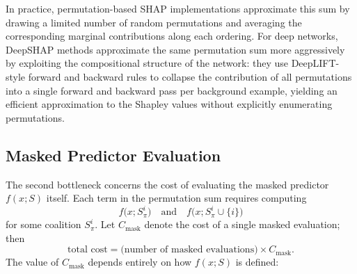 \documentclass{article}
\begin{document}
In practice, permutation-based SHAP implementations approximate this sum by drawing a limited number of random permutations and averaging the corresponding marginal contributions along each ordering.
For deep networks, DeepSHAP methods approximate the same permutation sum more aggressively by exploiting the compositional structure of the network: they use DeepLIFT-style forward and backward rules to collapse the contribution of all permutations into a single forward and backward pass per background example, yielding an efficient approximation to the Shapley values without explicitly enumerating permutations.

\subsection{Masked Predictor Evaluation}

The second bottleneck concerns the cost of evaluating the masked predictor $f(x; S)$ itself.
Each term in the permutation sum requires computing
\[
f\bigl(x; S_\pi^i\bigr)
\quad\text{and}\quad
f\bigl(x; S_\pi^i \cup \{i\}\bigr)
\]
for some coalition $S_\pi^i$.
Let $C_{\text{mask}}$ denote the cost of a single masked evaluation; then
\[
\text{total cost}
= \bigl(\text{number of masked evaluations}\bigr) \times C_{\text{mask}}.
\]
The value of $C_{\text{mask}}$ depends entirely on how $f(x; S)$ is defined:
\end{document}
